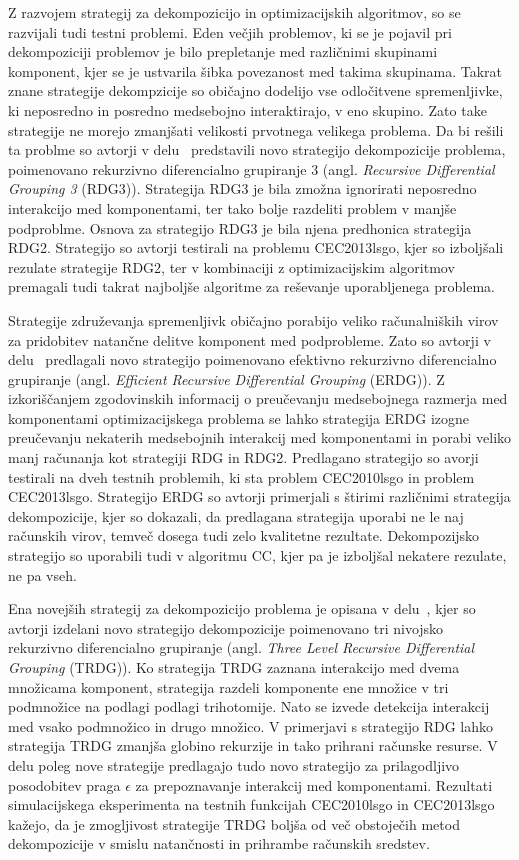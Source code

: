 Z razvojem strategij za dekompozicijo in optimizacijskih algoritmov, so se razvijali tudi testni problemi.
Eden večjih problemov, ki se je pojavil pri dekompoziciji problemov je bilo prepletanje med različnimi skupinami komponent, kjer se je ustvarila šibka povezanost med takima skupinama.
Takrat znane strategije dekompzicije so običajno dodelijo vse odločitvene spremenljivke, ki neposredno in posredno medsebojno interaktirajo, v eno skupino.
Zato take strategije ne morejo zmanjšati velikosti prvotnega velikega problema.
Da bi rešili ta problme so avtorji v delu~\cite{alg:rdg3} predstavili novo strategijo dekompozicije problema, poimenovano rekurzivno diferencialno grupiranje 3 (angl. \textit{Recursive Differential Grouping 3} (RDG3)).
Strategija RDG3 je bila zmožna ignorirati neposredno interakcijo med komponentami, ter tako bolje razdeliti problem v manjše podproblme.
Osnova za strategijo RDG3 je bila njena predhonica strategija RDG2.
Strategijo so avtorji testirali na problemu CEC2013lsgo, kjer so izboljšali rezulate strategije RDG2, ter v kombinaciji z optimizacijskim algoritmov premagali tudi takrat najboljše algoritme za reševanje uporabljenega problema.

Strategije združevanja spremenljivk običajno porabijo veliko računalniških virov za pridobitev natančne delitve komponent med podprobleme.
Zato so avtorji v delu~\cite{alg:erdg} predlagali novo strategijo poimenovano efektivno rekurzivno diferencialno grupiranje (angl. \textit{Efficient Recursive Differential Grouping} (ERDG)).
Z izkoriščanjem zgodovinskih informacij o preučevanju medsebojnega razmerja med komponentami optimizacijskega problema se lahko strategija ERDG izogne preučevanju nekaterih medsebojnih interakcij med komponentami in porabi veliko manj računanja kot strategiji RDG in RDG2.
Predlagano strategijo so avorji testirali na dveh testnih problemih, ki sta problem CEC2010lsgo in problem CEC2013lsgo.
Strategijo ERDG so avtorji primerjali s štirimi različnimi strategija dekompozicije, kjer so dokazali, da predlagana strategija uporabi ne le naj računskih virov, temveč dosega tudi zelo kvalitetne rezultate.
Dekompozijsko strategijo so uporabili tudi v algoritmu CC, kjer pa je izboljšal nekatere rezulate, ne pa vseh.

Ena novejših strategij za dekompozicijo problema je opisana v delu~\cite{alg:trdg}, kjer so avtorji izdelani novo strategijo dekompozicije poimenovano tri nivojsko rekurzivno diferencialno grupiranje (angl. \textit{Three Level Recursive Differential Grouping} (TRDG)).
Ko strategija TRDG zaznana interakcijo med dvema množicama komponent, strategija razdeli komponente ene množice v tri podmnožice na podlagi podlagi trihotomije.
Nato se izvede detekcija interakcij med vsako podmnožico in drugo množico.
V primerjavi s strategijo RDG lahko strategija TRDG zmanjša globino rekurzije in tako prihrani računske resurse.
V delu poleg nove strategije predlagajo tudo novo strategijo za prilagodljivo posodobitev praga $\epsilon$ za prepoznavanje interakcij med komponentami.
Rezultati simulacijskega eksperimenta na testnih funkcijah CEC2010lsgo in CEC2013lsgo kažejo, da je zmogljivost strategije TRDG boljša od več obstoječih metod dekompozicije v smislu natančnosti in prihrambe računskih sredstev.

